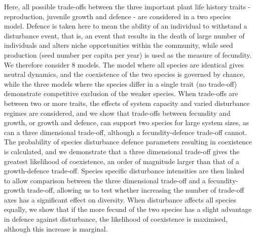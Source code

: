 Here, all possible trade-offs between the three important plant life history traits - reproduction, juvenile growth and defence - are considered in a two species model. Defence is taken here to mean the ability of an individual to withstand a disturbance event, that is, an event that results in the death of large number of individuals and alters niche opportunities within the community, while seed production (seed number per capita per year) is used as the measure of fecundity. We therefore consider 8 models. The model where all species are identical gives neutral dynamics, and the coexistence of the two species is governed by chance, while the three models where the species differ in a single trait (no trade-off) demonstrate competitive exclusion of the weaker species. When trade-offs are between two or more traits, the effects of system capacity and varied disturbance regimes  are considered, and we show that trade-offs between fecundity and growth, or growth and defence, can support two species for large system sizes, as can a three dimensional trade-off, although a fecundity-defence trade-off cannot. The probability of species disturbance defence parameters resulting in coexistence is calculated, and we demonstrate that a three dimensional trade-off gives the greatest likelihood of coexistence, an order of magnitude larger than that of a growth-defence trade-off. Species specific disturbance intensities are then linked to allow comparison between the three dimensional trade-off and a fecundity-growth trade-off, allowing us to test whether increasing the number of trade-off axes has a significant effect on diversity. When disturbance affects all species equally, we show that if the more fecund of the two species has a slight advantage in defence against disturbance, the likelihood of coexistence is maximised, although this increase is marginal.


